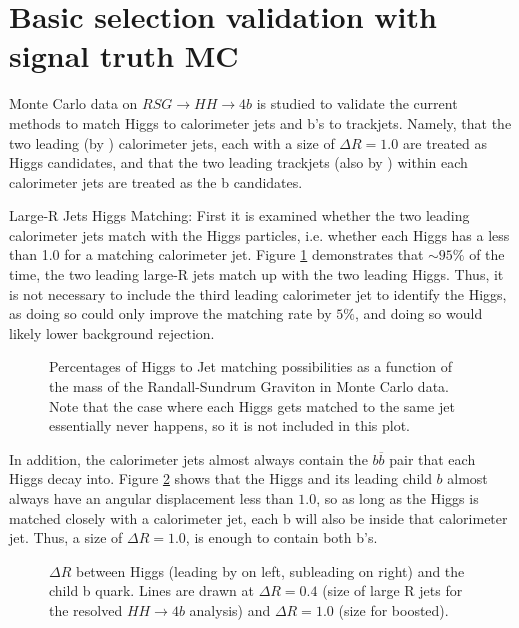 \section{Basic selection validation with signal truth MC}
\label{app:signal-mcstudy}

Monte Carlo data on $RSG \to HH \to 4b$ is studied to validate the current methods to match Higgs to calorimeter jets and b's to trackjets. Namely, that the two leading (by \pt) calorimeter jets, each with a size of $\Delta R = 1.0$ are treated as Higgs candidates, and that the two leading trackjets (also by \pt) within each calorimeter jets are treated as the b candidates.

Large-R Jets Higgs Matching: First it is examined whether the two leading calorimeter jets match with the Higgs particles, i.e. whether each Higgs has a \DR less than 1.0 for a matching calorimeter jet. Figure \ref{fig:app-truth-Higgs} demonstrates that $\sim 95\%$ of the time, the two leading large-R jets match up with the two leading Higgs. Thus, it is not necessary to include the third leading calorimeter jet to identify the Higgs, as doing so could only improve the matching rate by $5\%$, and doing so would likely lower background rejection.

\begin{figure}[htbp!]
\begin{center}
\caption{Percentages of Higgs to Jet matching possibilities as a function of the mass of the Randall-Sundrum Graviton in Monte Carlo data. Note that the case where each Higgs gets matched to the same jet essentially never happens, so it is not included in this plot.}
\label{fig:app-truth-Higgs}
\end{center}
\end{figure}

In addition, the calorimeter jets almost always contain the $b\overline{b}$ pair that each Higgs decay into. Figure \ref{fig:app-truth-HbdR} shows that the Higgs and its leading child $b$ almost always have an angular displacement less than $1.0$, so as long as the Higgs is matched closely with a calorimeter jet, each b will also be inside that calorimeter jet. Thus, a size of $\Delta R = 1.0$, is enough to contain both b's.

\begin{figure}[htbp!]
\begin{center}
\qquad
\caption{$\Delta R$ between Higgs (leading by \pt on left, subleading on right) and the child b quark. Lines are drawn at $\Delta R = 0.4$ (size of large R jets for the resolved $HH \to 4b$ analysis) and $\Delta R = 1.0$ (size for boosted). }
\label{fig:app-truth-HbdR}
\end{center}
\end{figure}

